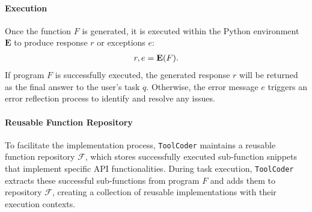 \paragraph{Execution}
Once the function $F$ is generated, it is executed within the Python environment $\mathbf{E}$ to produce response $r$ or exceptions $e$:  
\begin{equation}
\textstyle
\setlength\abovedisplayskip{0.2cm}
\setlength\belowdisplayskip{0.2cm}
\begin{aligned}
r, e = \mathbf{E}(F).
\end{aligned}
\end{equation}
If program $F$ is successfully executed, the generated response $r$ will be returned as the final answer to the user’s task $q$. Otherwise, the error message $e$ triggers an error reflection process to identify and resolve any issues.

\paragraph{Reusable Function Repository}
To facilitate the implementation process, \texttt{ToolCoder} maintains a reusable function repository $\mathcal{F}$, which stores successfully executed sub-function snippets that implement specific API functionalities. During task execution, \texttt{ToolCoder} extracts these successful sub-functions from program $F$ and adds them to repository $\mathcal{F}$, creating a collection of reusable implementations with their execution contexts.



